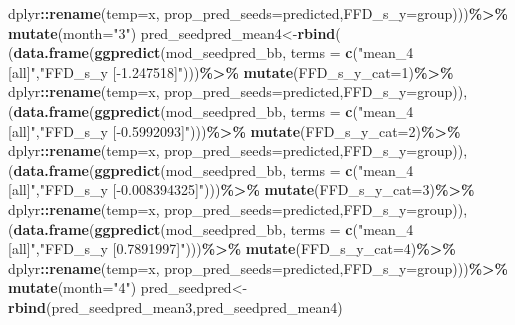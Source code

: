 \documentclass[
]{article}
\newenvironment{Shaded}{\begin{snugshade}}{\end{snugshade}}
\newcommand{\DataTypeTok}[1]{\textcolor[rgb]{0.13,0.29,0.53}{#1}}
\newcommand{\DecValTok}[1]{\textcolor[rgb]{0.00,0.00,0.81}{#1}}
\newcommand{\KeywordTok}[1]{\textcolor[rgb]{0.13,0.29,0.53}{\textbf{#1}}}
\newcommand{\NormalTok}[1]{#1}
\newcommand{\OperatorTok}[1]{\textcolor[rgb]{0.81,0.36,0.00}{\textbf{#1}}}
\newcommand{\StringTok}[1]{\textcolor[rgb]{0.31,0.60,0.02}{#1}}
\begin{document}
\begin{Shaded}
\begin{Highlighting}[]
\StringTok{     }\NormalTok{dplyr}\OperatorTok{::}\KeywordTok{rename}\NormalTok{(}\DataTypeTok{temp=}\NormalTok{x, }\DataTypeTok{prop\_pred\_seeds=}\NormalTok{predicted,}\DataTypeTok{FFD\_s\_y=}\NormalTok{group)))}\OperatorTok{\%\textgreater{}\%}
\StringTok{  }\KeywordTok{mutate}\NormalTok{(}\DataTypeTok{month=}\StringTok{"3"}\NormalTok{)}
\NormalTok{pred\_seedpred\_mean4\textless{}{-}}\KeywordTok{rbind}\NormalTok{(}
\NormalTok{  (}\KeywordTok{data.frame}\NormalTok{(}\KeywordTok{ggpredict}\NormalTok{(mod\_seedpred\_bb,}
                        \DataTypeTok{terms =} \KeywordTok{c}\NormalTok{(}\StringTok{"mean\_4 [all]"}\NormalTok{,}\StringTok{"FFD\_s\_y [{-}1.247518]"}\NormalTok{)))}\OperatorTok{\%\textgreater{}\%}
\StringTok{     }\KeywordTok{mutate}\NormalTok{(}\DataTypeTok{FFD\_s\_y\_cat=}\DecValTok{1}\NormalTok{)}\OperatorTok{\%\textgreater{}\%}
\StringTok{     }\NormalTok{dplyr}\OperatorTok{::}\KeywordTok{rename}\NormalTok{(}\DataTypeTok{temp=}\NormalTok{x, }\DataTypeTok{prop\_pred\_seeds=}\NormalTok{predicted,}\DataTypeTok{FFD\_s\_y=}\NormalTok{group)),}
\NormalTok{  (}\KeywordTok{data.frame}\NormalTok{(}\KeywordTok{ggpredict}\NormalTok{(mod\_seedpred\_bb,}
                        \DataTypeTok{terms =} \KeywordTok{c}\NormalTok{(}\StringTok{"mean\_4 [all]"}\NormalTok{,}\StringTok{"FFD\_s\_y [{-}0.5992093]"}\NormalTok{)))}\OperatorTok{\%\textgreater{}\%}
\StringTok{     }\KeywordTok{mutate}\NormalTok{(}\DataTypeTok{FFD\_s\_y\_cat=}\DecValTok{2}\NormalTok{)}\OperatorTok{\%\textgreater{}\%}
\StringTok{     }\NormalTok{dplyr}\OperatorTok{::}\KeywordTok{rename}\NormalTok{(}\DataTypeTok{temp=}\NormalTok{x, }\DataTypeTok{prop\_pred\_seeds=}\NormalTok{predicted,}\DataTypeTok{FFD\_s\_y=}\NormalTok{group)),}
\NormalTok{  (}\KeywordTok{data.frame}\NormalTok{(}\KeywordTok{ggpredict}\NormalTok{(mod\_seedpred\_bb,}
                        \DataTypeTok{terms =} \KeywordTok{c}\NormalTok{(}\StringTok{"mean\_4 [all]"}\NormalTok{,}\StringTok{"FFD\_s\_y [{-}0.008394325]"}\NormalTok{)))}\OperatorTok{\%\textgreater{}\%}
\StringTok{     }\KeywordTok{mutate}\NormalTok{(}\DataTypeTok{FFD\_s\_y\_cat=}\DecValTok{3}\NormalTok{)}\OperatorTok{\%\textgreater{}\%}
\StringTok{     }\NormalTok{dplyr}\OperatorTok{::}\KeywordTok{rename}\NormalTok{(}\DataTypeTok{temp=}\NormalTok{x, }\DataTypeTok{prop\_pred\_seeds=}\NormalTok{predicted,}\DataTypeTok{FFD\_s\_y=}\NormalTok{group)),}
\NormalTok{  (}\KeywordTok{data.frame}\NormalTok{(}\KeywordTok{ggpredict}\NormalTok{(mod\_seedpred\_bb,}
                        \DataTypeTok{terms =} \KeywordTok{c}\NormalTok{(}\StringTok{"mean\_4 [all]"}\NormalTok{,}\StringTok{"FFD\_s\_y [0.7891997]"}\NormalTok{)))}\OperatorTok{\%\textgreater{}\%}
\StringTok{     }\KeywordTok{mutate}\NormalTok{(}\DataTypeTok{FFD\_s\_y\_cat=}\DecValTok{4}\NormalTok{)}\OperatorTok{\%\textgreater{}\%}
\StringTok{     }\NormalTok{dplyr}\OperatorTok{::}\KeywordTok{rename}\NormalTok{(}\DataTypeTok{temp=}\NormalTok{x, }\DataTypeTok{prop\_pred\_seeds=}\NormalTok{predicted,}\DataTypeTok{FFD\_s\_y=}\NormalTok{group)))}\OperatorTok{\%\textgreater{}\%}
\StringTok{  }\KeywordTok{mutate}\NormalTok{(}\DataTypeTok{month=}\StringTok{"4"}\NormalTok{)}
\NormalTok{pred\_seedpred\textless{}{-}}\KeywordTok{rbind}\NormalTok{(pred\_seedpred\_mean3,pred\_seedpred\_mean4)}


\end{Highlighting}
\end{Shaded}
\end{document}

